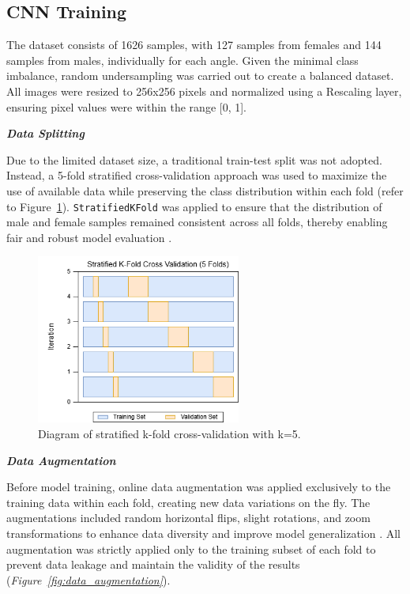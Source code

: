 \subsection{CNN Training}
The dataset consists of 1626 samples, with 127 samples from females and 144 samples from males, individually for each angle. Given the minimal class imbalance, random undersampling was carried out to create a balanced dataset. All images were resized to 256x256 pixels and normalized using a Rescaling layer, ensuring pixel values were within the range [0, 1].

\textbf{\textit{Data Splitting}}

Due to the limited dataset size, a traditional train-test split was not adopted. Instead, a 5-fold stratified cross-validation approach was used to maximize the use of available data while preserving the class distribution within each fold (refer to Figure~\ref{fig:skfold}). \texttt{StratifiedKFold} was applied to ensure that the distribution of male and female samples remained consistent across all folds, thereby enabling fair and robust model evaluation \cite{stratifiedKFold2020}.

\begin{figure}[h]
	\centering
	\includegraphics[width=0.6\textwidth]{figures/skf.png}
	\caption{Diagram of stratified k-fold cross-validation with k=5.}
	\label{fig:skfold}
\end{figure}

\textbf{\textit{Data Augmentation}}

Before model training, online data augmentation was applied exclusively to the training data within each fold, creating new data variations on the fly. The augmentations included random horizontal flips, slight rotations, and zoom transformations to enhance data diversity and improve model generalization \cite{awan2022}. All augmentation was strictly applied only to the training subset of each fold to prevent data leakage and maintain the validity of the results (\textit{Figure~\ref{fig:data_augmentation}}). 

